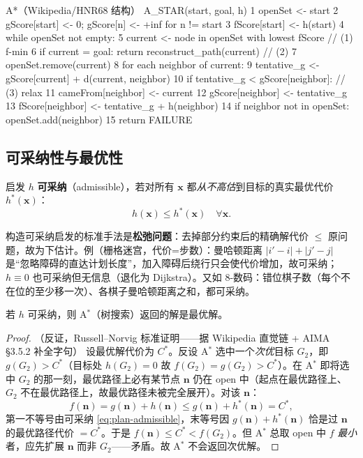 \begin{codebox}[text]{A*（Wikipedia/HNR68 结构）}
A_STAR(start, goal, h)
 1  openSet <- {start}
 2  gScore[start] <- 0; gScore[n] <- +inf for n != start
 3  fScore[start] <- h(start)
 4  while openSet not empty:
 5      current <- node in openSet with lowest fScore       // (1) f-min
 6      if current = goal: return reconstruct_path(current) // (2)
 7      openSet.remove(current)
 8      for each neighbor of current:
 9          tentative_g <- gScore[current] + d(current, neighbor)
10          if tentative_g < gScore[neighbor]:              // (3) relax
11              cameFrom[neighbor] <- current
12              gScore[neighbor]   <- tentative_g
13              fScore[neighbor]   <- tentative_g + h(neighbor)
14              if neighbor not in openSet: openSet.add(neighbor)
15  return FAILURE
\end{codebox}

\subsection{可采纳性与最优性}
\label{sec:plan-admissible}

\begin{definition}[可采纳启发]\label{def:plan-admissible}
启发 $h$ \textbf{可采纳}（admissible），若对所有 $\mathbf{x}$ 都\emph{从不高估}到目标的真实最优代价 $h^*(\mathbf{x})$：
\begin{equation}
  h(\mathbf{x})\le h^*(\mathbf{x})\quad\forall\mathbf{x}.
  \label{eq:plan-admissible}
\end{equation}
\end{definition}

\noindent 构造可采纳启发的标准手法是\textbf{松弛问题}：去掉部分约束后的精确解代价 $\le$ 原问题，故为下估计。例（栅格迷宫，代价=步数）：曼哈顿距离 $|i'-i|+|j'-j|$ 是“忽略障碍的直达计划长度”，加入障碍后绕行只会使代价增加，故可采纳；$h\equiv0$ 也可采纳但无信息（退化为 Dijkstra）。又如 8-数码：错位棋子数（每个不在位的至少移一次）、各棋子曼哈顿距离之和，都可采纳。

\begin{theorem}[A$^*$ 在可采纳启发下最优]\label{thm:plan-astar-opt}
若 $h$ 可采纳，则 A$^*$（树搜索）返回的解是最优解。
\end{theorem}
\begin{proof}（反证，Russell--Norvig 标准证明\rebuilt——据 Wikipedia 直觉链 + AIMA §3.5.2 补全字句）
设最优解代价为 $C^*$。反设 A$^*$ 选中一个\emph{次优}目标 $G_2$，即 $g(G_2)>C^*$（目标处 $h(G_2)=0$ 故 $f(G_2)=g(G_2)>C^*$）。在 A$^*$ 即将选中 $G_2$ 的那一刻，最优路径上必有某节点 $\mathbf{n}$ 仍在 open 中（起点在最优路径上、$G_2$ 不在最优路径上，故最优路径未被完全展开）。对该 $\mathbf{n}$：
\[
  f(\mathbf{n})=g(\mathbf{n})+h(\mathbf{n})\le g(\mathbf{n})+h^*(\mathbf{n})=C^*,
\]
第一不等号由可采纳 \cref{eq:plan-admissible}，末等号因 $g(\mathbf{n})+h^*(\mathbf{n})$ 恰是过 $\mathbf{n}$ 的最优路径代价 $=C^*$。于是 $f(\mathbf{n})\le C^*<f(G_2)$。但 A$^*$ 总取 open 中 $f$ \emph{最小}者，应先扩展 $\mathbf{n}$ 而非 $G_2$——矛盾。故 A$^*$ 不会返回次优解。
\end{proof}


